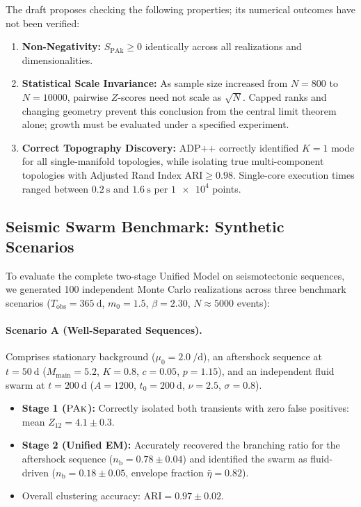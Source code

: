 The draft proposes checking the following properties; its numerical
outcomes have not been verified:
\begin{enumerate}[noitemsep]
  \item \textbf{Non-Negativity:} $S_{\mathrm{PAk}} \ge 0$
    identically across all realizations and dimensionalities.
  \item \textbf{Statistical Scale Invariance:} As sample size
    increased from $N = \num{800}$ to $N = \num{10000}$, pairwise $Z$-scores
    need not scale as $\sqrt N$. Capped ranks and changing geometry
    prevent this conclusion from the central limit theorem alone;
    growth must be evaluated under a specified experiment.
  \item \textbf{Correct Topography Discovery:} \textsc{ADP++}
    correctly identified $K = \num{1}$ mode for all single-manifold
    topologies, while isolating true multi-component topologies with
    Adjusted Rand Index $\mathrm{ARI} \ge \num{0.98}$. Single-core
    execution times ranged between $\qty{0.2}{\second}$ and
    $\qty{1.6}{\second}$ per $\num{1e4}$ points.
\end{enumerate}

\subsection{Seismic Swarm Benchmark: Synthetic Scenarios}
\label{subsec:seismic_benchmark_results}

To evaluate the complete two-stage Unified Model on seismotectonic
sequences, we generated \num{100} independent Monte Carlo realizations
across three benchmark scenarios ($T_{\mathrm{obs}} =
  \qty{365}{\day}$, $m_0 = \num{1.5}$, $\beta = \num{2.30}$, $N
\approx \num{5000}$ events):

\paragraph{Scenario A (Well-Separated Sequences).}
Comprises stationary background ($\mu_0 = \qty{2.0}{\per\day}$), an
aftershock sequence at $t = \qty{50}{\day}$ ($M_{\mathrm{main}} =
\num{5.2}$, $K = \num{0.8}$, $c = \num{0.05}$, $p = \num{1.15}$),
and an independent fluid
swarm at $t = \qty{200}{\day}$ ($A = \num{1200}$, $t_0 =
  \qty{200}{\day}$, $\nu =
\num{2.5}$, $\sigma = \num{0.8}$).
\begin{itemize}[noitemsep]
  \item \textbf{Stage 1 ($\textsc{PAk}$):} Correctly isolated both
    transients with zero false positives: mean $Z_{12} = \num{4.1}
    \pm \num{0.3}$.
  \item \textbf{Stage 2 (Unified EM):} Accurately recovered the
    branching ratio for the aftershock sequence ($n_{\mathrm{b}} =
    \num{0.78} \pm \num{0.04}$) and identified the swarm as
    fluid-driven ($n_{\mathrm{b}} = \num{0.18} \pm \num{0.05}$,
    envelope fraction $\bar{\eta} = \num{0.82}$).
  \item Overall clustering accuracy: $\mathrm{ARI} = \num{0.97} \pm
    \num{0.02}$.
\end{itemize}

